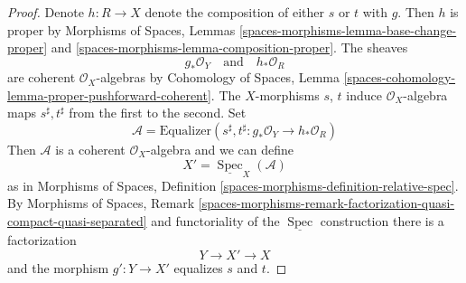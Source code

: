 \documentclass[10pt,a4paper]{amsart}
\theoremstyle{plain}
\theoremstyle{definition}
\theoremstyle{remark}
\numberwithin{equation}{subsection}
\def\Spec{\mathop{\mathrm{Spec}}}
\begin{document}
\begin{proof}
Denote $h : R \to X$ denote the composition of either $s$ or $t$
with $g$. Then $h$ is proper by Morphisms of Spaces, Lemmas
\ref{spaces-morphisms-lemma-base-change-proper} and
\ref{spaces-morphisms-lemma-composition-proper}.
The sheaves
$$
g_*\mathcal{O}_Y
\quad\text{and}\quad
h_*\mathcal{O}_R
$$
are coherent $\mathcal{O}_X$-algebras by Cohomology of Spaces, Lemma
\ref{spaces-cohomology-lemma-proper-pushforward-coherent}.
The $X$-morphisms $s$, $t$ induce $\mathcal{O}_X$-algebra maps
$s^\sharp, t^\sharp$ from the first to the second.
Set
$$
\mathcal{A} = \text{Equalizer}\left(s^\sharp, t^\sharp :
g_*\mathcal{O}_Y \longrightarrow h_*\mathcal{O}_R\right)
$$
Then $\mathcal{A}$ is a coherent $\mathcal{O}_X$-algebra and we
can define
$$
X' = \underline{\Spec}_X(\mathcal{A})
$$
as in Morphisms of Spaces, Definition
\ref{spaces-morphisms-definition-relative-spec}.
By Morphisms of Spaces, Remark
\ref{spaces-morphisms-remark-factorization-quasi-compact-quasi-separated}
and functoriality of the $\underline{\Spec}$ construction
there is a factorization
$$
Y \longrightarrow X' \longrightarrow X
$$
and the morphism $g' : Y \to X'$ equalizes $s$ and $t$.


\end{proof}
\end{document}
